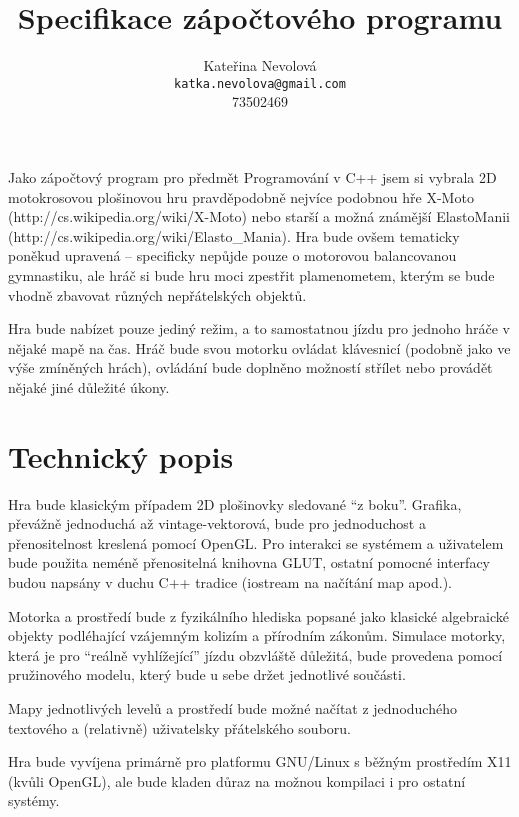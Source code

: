 \documentclass{article}
\title{Specifikace zápočtového programu}
\author{Kateřina Nevolová \\ \texttt{katka.nevolova@gmail.com} \\ 73502469}
\begin{document}
\maketitle

Jako zápočtový program pro předmět Programování v C++ jsem si vybrala 2D motokrosovou plošinovou hru pravděpodobně nejvíce podobnou hře X-Moto (http://cs.wikipedia.org/wiki/X-Moto) nebo starší a možná známější ElastoManii (http://cs.wikipedia.org/wiki/Elasto\_Mania). Hra bude ovšem tematicky poněkud upravená -- specificky nepůjde pouze o motorovou balancovanou gymnastiku, ale hráč si bude hru moci zpestřit plamenometem, kterým se bude vhodně zbavovat různých nepřátelských objektů.

Hra bude nabízet pouze jediný režim, a to samostatnou jízdu pro jednoho hráče v nějaké mapě na čas. Hráč bude svou motorku ovládat klávesnicí (podobně jako ve výše zmíněných hrách), ovládání bude doplněno možností střílet nebo provádět nějaké jiné důležité úkony.

\section{Technický popis}

Hra bude klasickým případem 2D plošinovky sledované ``z boku''. Grafika, převážně jednoduchá až vintage-vektorová, bude pro jednoduchost a přenositelnost kreslená pomocí OpenGL. Pro interakci se systémem a uživatelem bude použita neméně přenositelná knihovna GLUT, ostatní pomocné interfacy budou napsány v duchu C++ tradice (iostream na načítání map apod.).

Motorka a prostředí bude z fyzikálního hlediska popsané jako klasické algebraické objekty podléhající vzájemným kolizím a přírodním zákonům. Simulace motorky, která je pro ``reálně vyhlížející'' jízdu obzvláště důležitá, bude provedena pomocí pružinového modelu, který bude u sebe držet jednotlivé součásti.

Mapy jednotlivých levelů a prostředí bude možné načítat z jednoduchého textového a (relativně) uživatelsky přátelského souboru.

Hra bude vyvíjena primárně pro platformu GNU/Linux s běžným prostředím X11 (kvůli OpenGL), ale bude kladen důraz na možnou kompilaci i pro ostatní systémy.
\end{document}
